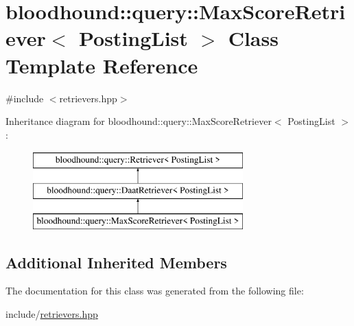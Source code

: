 \hypertarget{classbloodhound_1_1query_1_1MaxScoreRetriever}{}\section{bloodhound\+:\+:query\+:\+:Max\+Score\+Retriever$<$ Posting\+List $>$ Class Template Reference}
\label{classbloodhound_1_1query_1_1MaxScoreRetriever}


{\ttfamily \#include $<$retrievers.\+hpp$>$}

Inheritance diagram for bloodhound\+:\+:query\+:\+:Max\+Score\+Retriever$<$ Posting\+List $>$\+:\begin{figure}[H]
\begin{center}
\leavevmode
\includegraphics[height=3.000000cm]{classbloodhound_1_1query_1_1MaxScoreRetriever}
\end{center}
\end{figure}
\subsection*{Additional Inherited Members}


The documentation for this class was generated from the following file\+:\begin{DoxyCompactItemize}
\item 
include/\hyperlink{retrievers_8hpp}{retrievers.\+hpp}\end{DoxyCompactItemize}
